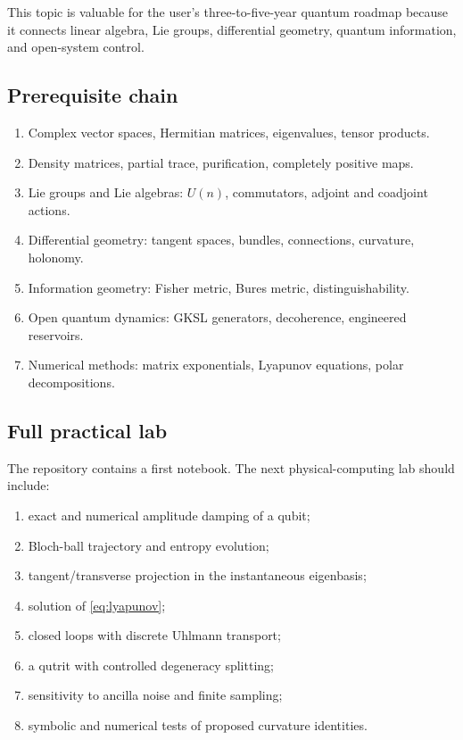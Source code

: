 This topic is valuable for the user's three-to-five-year quantum roadmap because it connects linear algebra, Lie groups, differential geometry, quantum information, and open-system control.

\subsection{Prerequisite chain}

\begin{enumerate}[label=\arabic*.]
  \item Complex vector spaces, Hermitian matrices, eigenvalues, tensor products.
  \item Density matrices, partial trace, purification, completely positive maps.
  \item Lie groups and Lie algebras: $U(n)$, commutators, adjoint and coadjoint actions.
  \item Differential geometry: tangent spaces, bundles, connections, curvature, holonomy.
  \item Information geometry: Fisher metric, Bures metric, distinguishability.
  \item Open quantum dynamics: GKSL generators, decoherence, engineered reservoirs.
  \item Numerical methods: matrix exponentials, Lyapunov equations, polar decompositions.
\end{enumerate}

\subsection{Full practical lab}

The repository contains a first notebook. The next physical-computing lab should include:

\begin{enumerate}
  \item exact and numerical amplitude damping of a qubit;
  \item Bloch-ball trajectory and entropy evolution;
  \item tangent/transverse projection in the instantaneous eigenbasis;
  \item solution of \cref{eq:lyapunov};
  \item closed loops with discrete Uhlmann transport;
  \item a qutrit with controlled degeneracy splitting;
  \item sensitivity to ancilla noise and finite sampling;
  \item symbolic and numerical tests of proposed curvature identities.
\end{enumerate}

